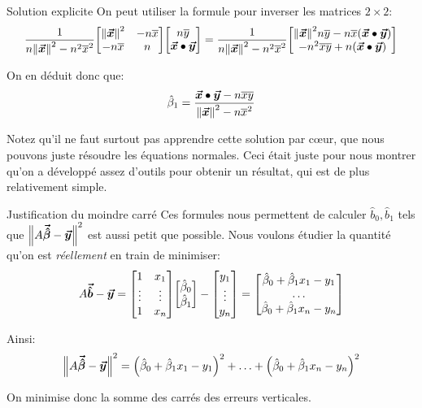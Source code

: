 \documentclass[a4paper]{article}
\begin{document}
\begin{parag}{Solution explicite}
    On peut utiliser la formule pour inverser les matrices $2 \times 2$:
    \[\frac{1}{n \left\|\bvec{x}\right\|^2 - n^2 \bar{x}^2} \begin{bmatrix} \left\|\bvec{x}\right\|^2 & -n \bar{x} \\ -n \bar{x} & n \end{bmatrix} \begin{bmatrix} n \bar{y} \\ \bvec{x} \dotprod \bvec{y} \end{bmatrix} = \frac{1}{n \left\|\bvec{x}\right\|^2 - n^2 \bar{x}^2} \begin{bmatrix} \left\|\bvec{x}\right\|^2 n \bar{y} - n \bar{x} \left(\bvec{x} \dotprod \bvec{y}\right) \\ -n^2 \bar{x} \bar{y} + n\left(\bvec{x} \dotprod \bvec{y}\right)  \end{bmatrix}\]

    On en déduit donc que:
    \[\hat{\beta}_1 = \frac{\bvec{x} \dotprod \bvec{y} - n \bar{x} \bar{y}}{\left\|\bvec{x}\right\|^2 - n \bar{x}^2}\]

    Notez qu'il ne faut surtout pas apprendre cette solution par cœur, que nous pouvons juste résoudre les équations normales. Ceci était juste pour nous montrer qu'on a développé assez d'outils pour obtenir un résultat, qui est de plus relativement simple.
\end{parag}

\begin{parag}{Justification du moindre carré}
    Ces formules nous permettent de calculer $\hat{b}_0, \hat{b}_1$ tels que $\left\|A \bvec{\hat{\beta}} - \bvec{y}\right\|^2$ est aussi petit que possible. Nous voulons étudier la quantité qu'on est \textit{réellement} en train de minimiser:
    \[A \bvec{\hat{b}} - \bvec{y} = \begin{bmatrix} 1 & x_1 \\ \vdots & \vdots \\ 1 & x_n \end{bmatrix} \begin{bmatrix} \hat{\beta}_0 \\ \hat{\beta}_1 \end{bmatrix} - \begin{bmatrix} y_1 \\ \vdots \\ y_n \end{bmatrix} = \begin{bmatrix} \hat{\beta}_0 + \hat{\beta}_1 x_1 - y_1 \\ \ldots \\ \hat{\beta}_0 + \hat{\beta}_1 x_n - y_n \end{bmatrix} \]

    Ainsi:
    \[\left\|A \bvec{\hat{\beta}} - \bvec{y}\right\|^2 = \left(\hat{\beta}_0 + \hat{\beta}_1 x_1 - y_1\right)^2 + \ldots + \left(\hat{\beta}_0 + \hat{\beta}_1 x_n - y_n\right)^2\]

    On minimise donc la somme des carrés des erreurs verticales.

\end{parag}
\end{document}
